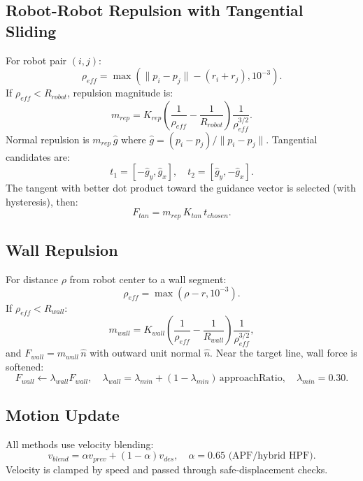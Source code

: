 \documentclass[11pt,a4paper]{article}
\begin{document}
\subsection{Robot-Robot Repulsion with Tangential Sliding}
For robot pair $(i,j)$:
\begin{equation}
    \rho_{eff}=\max\left(\|p_i-p_j\|-(r_i+r_j),10^{-3}\right).
\end{equation}
If $\rho_{eff}<R_{robot}$, repulsion magnitude is:
\begin{equation}
    m_{rep}=K_{rep}\left(\frac{1}{\rho_{eff}}-\frac{1}{R_{robot}}\right)\frac{1}{\rho_{eff}^{3/2}}.
\end{equation}
Normal repulsion is $m_{rep}\,\hat g$ where $\hat g=(p_i-p_j)/\|p_i-p_j\|$.
Tangential candidates are:
\begin{equation}
    t_1=[-\hat g_y,\hat g_x],\quad t_2=[\hat g_y,-\hat g_x].
\end{equation}
The tangent with better dot product toward the guidance vector is selected (with hysteresis), then:
\begin{equation}
    F_{tan}=m_{rep}\,K_{tan}\,t_{chosen}.
\end{equation}

\subsection{Wall Repulsion}
For distance $\rho$ from robot center to a wall segment:
\begin{equation}
    \rho_{eff}=\max(\rho-r,10^{-3}).
\end{equation}
If $\rho_{eff}<R_{wall}$:
\begin{equation}
    m_{wall}=K_{wall}\left(\frac{1}{\rho_{eff}}-\frac{1}{R_{wall}}\right)\frac{1}{\rho_{eff}^{3/2}},
\end{equation}
and $F_{wall}=m_{wall}\,\hat n$ with outward unit normal $\hat n$.
Near the target line, wall force is softened:
\begin{equation}
    F_{wall}\leftarrow \lambda_{wall}F_{wall},\quad
    \lambda_{wall}=\lambda_{min}+(1-\lambda_{min})\,\mathrm{approachRatio},\quad
    \lambda_{min}=0.30.
\end{equation}

\subsection{Motion Update}
All methods use velocity blending:
\begin{equation}
    v_{blend}=\alpha v_{prev} + (1-\alpha)v_{des},\quad \alpha=0.65 \text{ (APF/hybrid HPF)}.
\end{equation}
Velocity is clamped by speed and passed through safe-displacement checks.
\end{document}
